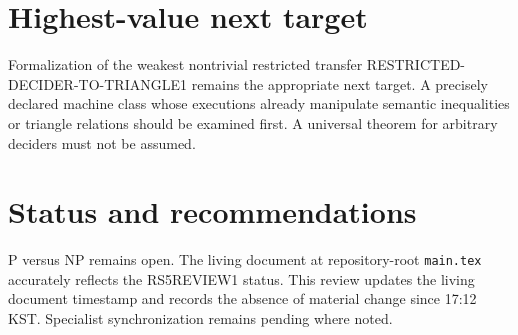 \documentclass[11pt]{article}
\begin{document}
\section{Highest-value next target}
Formalization of the weakest nontrivial restricted transfer RESTRICTED-DECIDER-TO-TRIANGLE1 remains the appropriate next target. A precisely declared machine class whose executions already manipulate semantic inequalities or triangle relations should be examined first. A universal theorem for arbitrary deciders must not be assumed.

\section{Status and recommendations}
P versus NP remains open. The living document at repository-root \texttt{main.tex} accurately reflects the RS5REVIEW1 status. This review updates the living document timestamp and records the absence of material change since 17:12 KST. Specialist synchronization remains pending where noted.

\end{document}
